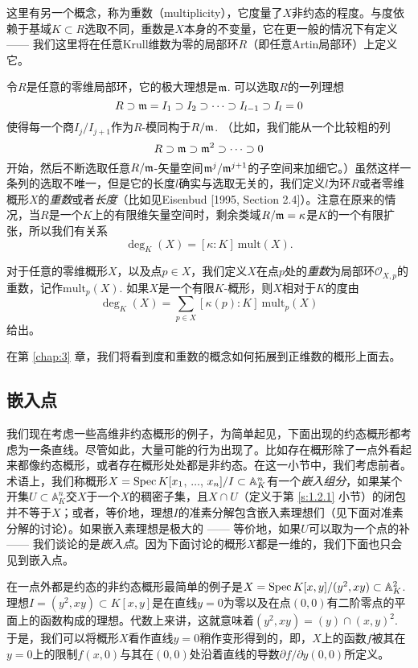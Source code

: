 这里有另一个概念，称为重数（multiplicity），它度量了$X$非约态的程度。与度依赖于基域$K\subset R$选取不同，重数是$X$本身的不变量，它在更一般的情况下有定义 ------ 我们这里将在任意Krull维数为零的局部环$R$（即任意Artin局部环）上定义它。

令$R$是任意的零维局部环，它的极大理想是$\mathfrak{m}$. 可以选取$R$的一列理想
\[
	R\supset \mathfrak{m} = I_1\supset I_2\supset \cdots \supset I_{l-1}\supset I_l=0
\]
使得每一个商$I_j/I_{j+1}$作为$R$\hyp 模同构于$R/\mathfrak{m}$. （比如，我们能从一个比较粗的列
\[
	R\supset \mathfrak{m} \supset \mathfrak{m}^2\supset \cdots \supset 0
\]
开始，然后不断选取任意$R/\mathfrak{m}$\hyp 矢量空间$\mathfrak{m}^j/\mathfrak{m}^{j+1}$的子空间来加细它。）虽然这样一条列的选取不唯一，但是它的长度$l$确实与选取无关的，我们定义$l$为环$R$或者零维概形$X$的\textit{重数}或者\textit{长度}（比如见Eisenbud [1995, Section 2.4]）。注意在原来的情况，当$R$是一个$K$上的有限维矢量空间时，剩余类域$R/\mathfrak{m}=\kappa$是$K$的一个有限扩张，所以我们有关系
\[
	\deg_K(X)=[\kappa:K]~\mathrm{mult}(X).
\]

对于任意的零维概形$X$，以及点$p\in X$，我们定义$X$在点$p$处的\textit{重数}为局部环$\mathscr{O}_{X,p}$的重数，记作$\mathrm{mult}_p(X)$. 如果$X$是一个有限$K$\hyp 概形，则$X$相对于$K$的度由
\[
	\deg_K(X)=\sum_{p\in X}[\kappa(p):K]~\mathrm{mult}_p(X)
\]
给出。

在第 \ref{chap:3} 章，我们将看到度和重数的概念如何拓展到正维数的概形上面去。

\subsection{嵌入点}

我们现在考虑一些高维非约态概形的例子，为简单起见，下面出现的约态概形都考虑为一条直线。尽管如此，大量可能的行为出现了。比如存在概形除了一点外看起来都像约态概形，或者存在概形处处都是非约态。在这一小节中，我们考虑前者。术语上，我们称概形$X=\operatorname{Spec} K[x_1$, $\dots$, $x_n]/I\subset \mathbb{A}_{K}^n$有一个\textit{嵌入组分}，如果某个开集$U\subset \mathbb{A}^n_K$交$X$于一个$X$的稠密子集，且$X\cap U$（定义于第 \ref{s:1.2.1} 小节）的闭包并不等于$X$；或者，等价地，理想$I$的准素分解包含嵌入素理想们（见下面对准素分解的讨论）。如果嵌入素理想是极大的 ------ 等价地，如果$U$可以取为一个点的补 ------ 我们谈论的是\textit{嵌入点}。因为下面讨论的概形$X$都是一维的，我们下面也只会见到嵌入点。

在一点外都是约态的非约态概形最简单的例子是$X=\operatorname{Spec} K[x,y]/(y^2,xy)\subset \mathbb{A}_K^2$. 理想$I=(y^2,xy)\subset K[x,y]$是在直线$y=0$为零以及在点$(0,0)$有二阶零点的平面上的函数构成的理想。代数上来讲，这就意味着$(y^2,xy)=(y)\cap (x,y)^2$. 于是，我们可以将概形$X$看作直线$y=0$稍作变形得到的，即，$X$上的函数$f$被其在$y=0$上的限制$f(x,0)$与其在$(0,0)$处沿着直线的导数$\partial f/\partial y(0,0)$所定义。

